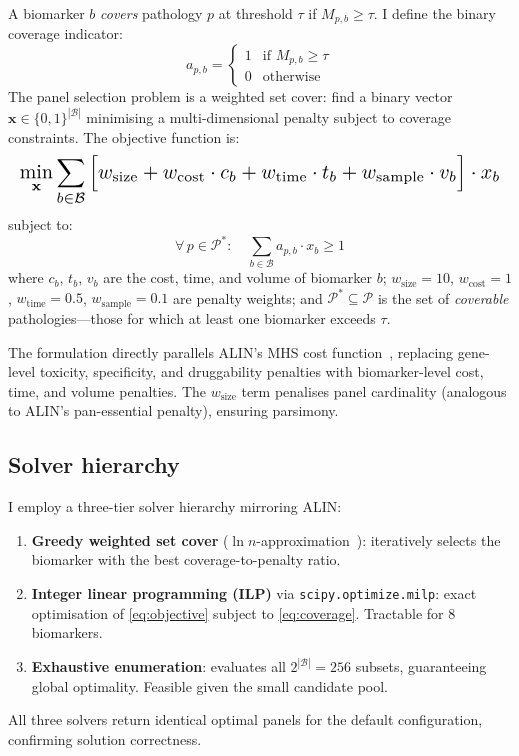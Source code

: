 \documentclass[times, twoside, watermark]{zHenriquesLab-StyleBioRxiv}
\begin{document}
A biomarker $b$ \emph{covers} pathology $p$ at threshold $\tau$ if $M_{p,b} \geq \tau$. I define the binary coverage indicator:
\begin{equation}
a_{p,b} = \begin{cases} 1 & \text{if } M_{p,b} \geq \tau \\ 0 & \text{otherwise} \end{cases}
\end{equation}
The panel selection problem is a weighted set cover: find a binary vector $\mathbf{x} \in \{0,1\}^{|\mathcal{B}|}$ minimising a multi-dimensional penalty subject to coverage constraints. The objective function is:
\begin{equation}
\resizebox{\columnwidth}{!}{$\displaystyle
\min_{\mathbf{x}} \sum_{b \in \mathcal{B}} \Big[ w_{\text{size}} + w_{\text{cost}} \cdot c_b + w_{\text{time}} \cdot t_b + w_{\text{sample}} \cdot v_b \Big] \cdot x_b
$}
\label{eq:objective}
\end{equation}
subject to:
\begin{equation}
\forall\, p \in \mathcal{P}^* : \quad \sum_{b \in \mathcal{B}} a_{p,b} \cdot x_b \geq 1
\label{eq:coverage}
\end{equation}
where $c_b$, $t_b$, $v_b$ are the cost, time, and volume of biomarker $b$; $w_{\text{size}} = 10$, $w_{\text{cost}} = 1$, $w_{\text{time}} = 0.5$, $w_{\text{sample}} = 0.1$ are penalty weights; and $\mathcal{P}^* \subseteq \mathcal{P}$ is the set of \emph{coverable} pathologies---those for which at least one biomarker exceeds $\tau$.

The formulation directly parallels ALIN's MHS cost function~\cite{Erzurumluoglu2026ALIN}, replacing gene-level toxicity, specificity, and druggability penalties with biomarker-level cost, time, and volume penalties. The $w_{\text{size}}$ term penalises panel cardinality (analogous to ALIN's pan-essential penalty), ensuring parsimony.

\subsection*{Solver hierarchy}

I employ a three-tier solver hierarchy mirroring ALIN:
\begin{enumerate}
\item \textbf{Greedy weighted set cover} ($\ln n$-approximation~\cite{Chvatal1979,Vazirani2001}): iteratively selects the biomarker with the best coverage-to-penalty ratio.
\item \textbf{Integer linear programming (ILP)} via \texttt{scipy.optimize.milp}: exact optimisation of \cref{eq:objective} subject to \cref{eq:coverage}. Tractable for 8 biomarkers.
\item \textbf{Exhaustive enumeration}: evaluates all $2^{|\mathcal{B}|} = 256$ subsets, guaranteeing global optimality. Feasible given the small candidate pool.
\end{enumerate}
All three solvers return identical optimal panels for the default configuration, confirming solution correctness.
\end{document}
